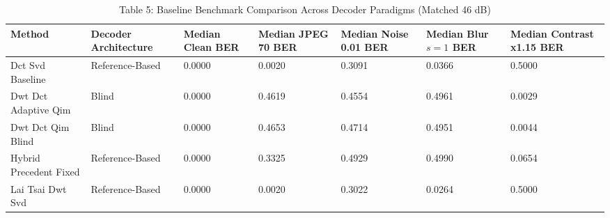 \begin{table}[htbp]
\centering
\caption{Table 5: Baseline Benchmark Comparison Across Decoder Paradigms (Matched 46 dB)}
\begin{tabular}{lllllll}
\toprule
Method & Decoder Architecture & Median Clean BER & Median JPEG 70 BER & Median Noise 0.01 BER & Median Blur $s=1$ BER & Median Contrast x1.15 BER \\
\midrule
Dct Svd Baseline & Reference-Based & 0.0000 & 0.0020 & 0.3091 & 0.0366 & 0.5000 \\
Dwt Dct Adaptive Qim & Blind & 0.0000 & 0.4619 & 0.4554 & 0.4961 & 0.0029 \\
Dwt Dct Qim Blind & Blind & 0.0000 & 0.4653 & 0.4714 & 0.4951 & 0.0044 \\
Hybrid Precedent Fixed & Reference-Based & 0.0000 & 0.3325 & 0.4929 & 0.4990 & 0.0654 \\
Lai Tsai Dwt Svd & Reference-Based & 0.0000 & 0.0020 & 0.3022 & 0.0264 & 0.5000 \\
\bottomrule
\end{tabular}
\end{table}
